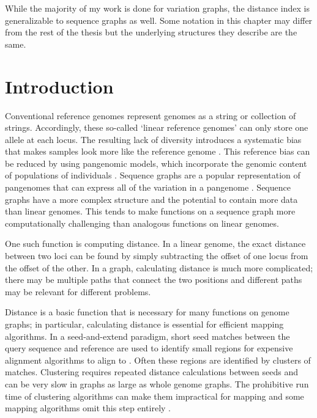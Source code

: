 \documentclass[11pt]{ucscthesis}
\begin{document}
While the majority of my work is done for variation graphs, the distance index is generalizable to sequence graphs as well.
Some notation in this chapter may differ from the rest of the thesis but the underlying structures they describe are the same.

\section{Introduction}
Conventional reference genomes represent genomes as a string or collection of strings.
Accordingly, these so-called ‘linear reference genomes’ can only store one allele at each locus.
The resulting lack of diversity introduces a systematic bias that makes samples look more like the reference genome \cite{zook_integrating_2014}.
This reference bias can be reduced by using pangenomic models, which incorporate the genomic content of populations of individuals \cite{noauthor_computational_2016}.
Sequence graphs are a popular representation of pangenomes that can express all of the variation in a pangenome \cite{paten_genome_2017}. 
Sequence graphs have a more complex structure and the potential to contain more data than linear genomes.
This tends to make functions on a sequence graph more computationally challenging than analogous functions on linear genomes.

One such function is computing distance.
In a linear genome, the exact distance between two loci can be found by simply subtracting the offset of one locus from the offset of the other.
In a graph, calculating distance is much more complicated; there may be multiple paths that connect the two positions and different paths may be relevant for different problems.

Distance is a basic function that is necessary for many functions on genome graphs; in particular, calculating distance is essential for efficient mapping algorithms.
In a seed-and-extend paradigm, short seed matches between the query sequence and reference are used to identify small regions for expensive alignment algorithms to align to \cite{schneeberger_simultaneous_2009,li_minimap_2016,rakocevic_fast_2019,garrison_variation_2018,vaddadi_read_2019,rautiainen_bit-parallel_2019}. 
Often these regions are identified by clusters of matches. 
Clustering requires repeated distance calculations between seeds and can be very slow in graphs as large as whole genome graphs. 
The prohibitive run time of clustering algorithms can make them impractical for mapping and some mapping algorithms omit this step entirely \cite{rautiainen_bit-parallel_2019}.
\end{document}
